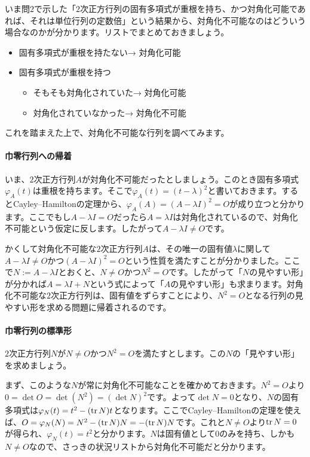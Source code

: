 いま問$2$で示した「$2$次正方行列の固有多項式が重根を持ち、かつ対角化可能であれば、それは単位行列の定数倍」という結果から、対角化不可能なのはどういう場合なのかが分かります。リストでまとめておきましょう。
\begin{itemize}
\item 固有多項式が重根を持たない\hspace{2zw}→ 対角化可能
\item 固有多項式が重根を持つ
\begin{itemize}
\item そもそも対角化されていた\hspace{1zw}→ 対角化可能
\item 対角化されていなかった\hspace{2zw}→ 対角化不可能
\end{itemize}
\end{itemize}
これを踏まえた上で、対角化不可能な行列を調べてみます。

\paragraph{巾零行列への帰着}

いま、$2$次正方行列$A$が対角化不可能だったとしましょう。このとき固有多項式$\varphi_A(t)$は重根を持ちます。そこで$\varphi_A(t) = (t - \lambda)^2$と書いておきます。するとCayley--Hamiltonの定理から、$\varphi_A(A) = (A - \lambda I)^2 = O$が成り立つと分かります。ここでもし$A - \lambda I = O$だったら$A = \lambda I$は対角化されているので、対角化不可能という仮定に反します。したがって$A - \lambda I \neq O$です。

かくして対角化不可能な$2$次正方行列$A$は、その唯一の固有値$\lambda$に関して$A - \lambda I \neq O$かつ$(A - \lambda I)^2 = O$という性質を満たすことが分かりました。ここで$N := A - \lambda I$とおくと、$N \neq O$かつ$N^2 = O$です。したがって「$N$の見やすい形」が分かれば$A = \lambda I + N$という式によって「$A$の見やすい形」も求まります。対角化不可能な$2$次正方行列は、固有値をずらすことにより、$N^2 = O$となる行列の見やすい形を求める問題に帰着されるのです。

\paragraph{巾零行列の標準形}

$2$次正方行列$N$が$N \neq O$かつ$N^2 = O$を満たすとします。この$N$の「見やすい形」を求めましょう。

まず、このような$N$が常に対角化不可能なことを確かめておきます。$N^2 = O$より$0 = \det O = \det (N^2) = (\det N)^2$です。よって$\det N = 0$となり、$N$の固有多項式は$\varphi_N(t) = t^2 - (\operatorname{tr} N)t$となります。ここでCayley--Hamiltonの定理を使えば、$O = \varphi_N(N) = N^2 - (\operatorname{tr} N)N = -(\operatorname{tr} N)N$です。これと$N \neq O$より$\operatorname{tr} N = 0$が得られ、$\varphi_N(t) = t^2$と分かります。$N$は固有値として$0$のみを持ち、しかも$N \neq O$なので、さっきの状況リストから対角化不可能だと分かります。

